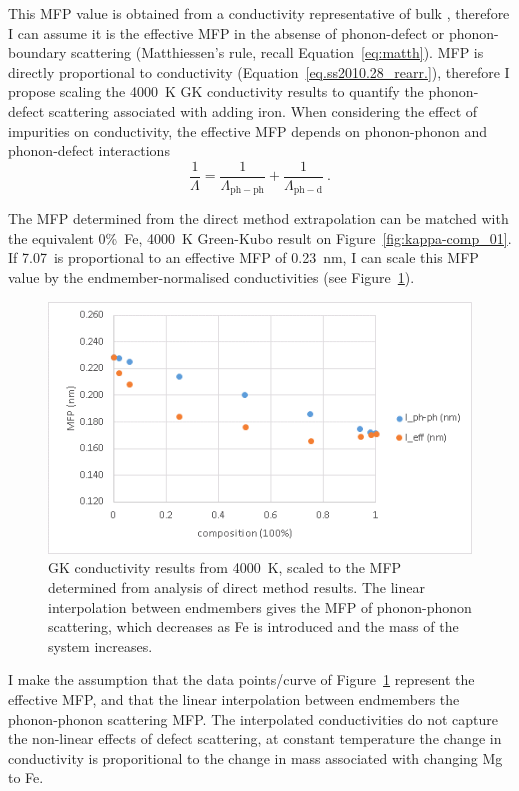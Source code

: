 This MFP value is obtained from a conductivity representative of bulk \mgsios \bdg, therefore I can assume it is the effective MFP in the absense of phonon-defect or phonon-boundary scattering (Matthiessen's rule, recall Equation~\ref{eq:matth}). MFP is directly proportional to conductivity (Equation~\ref{eq.ss2010.28_rearr.}), therefore I propose scaling the 4000~K GK conductivity results to quantify the phonon-defect scattering associated with adding iron. When considering the effect of impurities on conductivity, the effective MFP depends on phonon-phonon and phonon-defect interactions
%
\begin{equation}
\frac{1}{\Lambda}=\frac{1}{\Lambda_{\mathrm{ph-ph}}}+\frac{1}{\Lambda_{\mathrm{ph-d}}}\ .
\label{eq:matth_mfp_mod}
\end{equation}

The MFP determined from the direct method extrapolation can be matched with the equivalent 0\%~Fe, 4000~K Green-Kubo result on Figure~\ref{fig:kappa-comp_01}. If 7.07~\wmks is proportional to an effective MFP of 0.23~nm, I can scale this MFP value by the \mgsios endmember-normalised conductivities (see Figure~\ref{kc_4000_mfp_norm}). 

\begin{figure}[h!]
  \includegraphics[width=\linewidth]{Figures/kc_4000_mfp_norm.png}
  \caption[kc 4000 mfp norm]{GK conductivity results from 4000~K, scaled to the MFP determined from analysis of direct method results. The linear interpolation between endmembers gives the MFP of phonon-phonon scattering, which decreases as Fe is introduced and the mass of the system increases.}
  \label{kc_4000_mfp_norm}
\end{figure}

I make the assumption that the data points/curve of Figure~\ref{kc_4000_mfp_norm} represent the effective MFP, and that the linear interpolation between endmembers the phonon-phonon scattering MFP. The interpolated conductivities do not capture the non-linear effects of defect scattering, at constant temperature the change in conductivity is proporitional to the change in mass associated with changing Mg to Fe.

